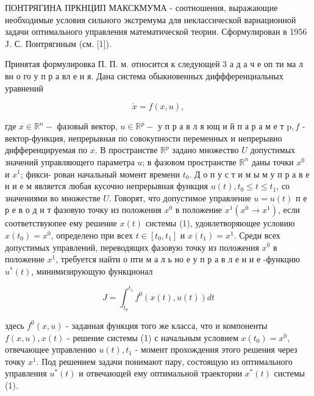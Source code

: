 \documentclass[10pt]{article}
\begin{document}
ПОНТРЯГИНА ПРКНЦИП МАКСКМУМА - соотношения, выражающие необходимые условия сильного экстремума для неклассической вариационной задачи оптимального управления математической теории. Сформулирован в 1956 J. С. Понтрягиным (см. [1]).



Принятая формулировка П. П. м. относится к следующей 3 а д а ч е оп ти ма л вн о го у п р а вл е и я. Дана система обыкновенных диффференциальных уравнений



\[

\dot{x}=f(x, u),

\]



где $x \in \mathbb{R}^{n}-$ фазовый вектор, $u \in \mathbb{R}^{p}-$ у п р а в л я ющ и й п а р а м е т $\mathrm{p}, f$ - вектор-функция, непрерывная по совокупности переменных и непрерывно дифференцируемая по $x$. В пространстве $\mathbb{R}^{p}$ задано множество $U$ допустимых значений управляющего параметра $u$; в фазовом пространстве $\mathbb{R}^{n}$ даны точки $x^{0}$ и $x^{1}$; фикси- рован начальный момент времени $t_{0}$. Д о п у с т и м ы м у п р а в е н и е м является любая кусочно непрерывная функция $u(t), t_{0} \leqslant t \leqslant t_{1}$, со значениями во множестве $U$. Говорят, что допустимое управление $u=u(t)$ п е р е в о д и т фазовую точку из положения $x^{0}$ в положение $x^{1}\left(x^{0} \rightarrow x^{1}\right)$, если соответствуюпее ему решение $x(t)$ системы (1), удовлетворяющее условию $x\left(t_{0}\right)=x^{0}$, определено при всех $t \in\left[t_{0}, t_{1}\right]$ и $x\left(t_{1}\right)=x^{1}$. Среди всех допустимых управлений, переводящих фазовую точку из положения $x^{0}$ в положение $x^{1}$, требуется найти о пти м а л ь но е у п р а в л е н и е -функцию $u^{*}(t)$, минимизирующую функционал



\[

J=\int_{t_{0}}^{t_{1}} f^{0}(x(t), u(t)) d t

\]



здесь $f^{0}(x, u)$ - заданная функция того же класса, что и компоненты $f(x, u), x(t)$ - решение системы (1) с начальным условием $x\left(t_{0}\right)=x^{0}$, отвечающее управлению $u(t), t_{1}$ - момент прохождения этого решения через точку $x^{1}$. Под решением задачи понимают пару, состоящую из оптимального управления $u^{*}(t)$ и отвечающей ему оптимальной траектории $x^{*}(t)$ системы (1).
\end{document}
